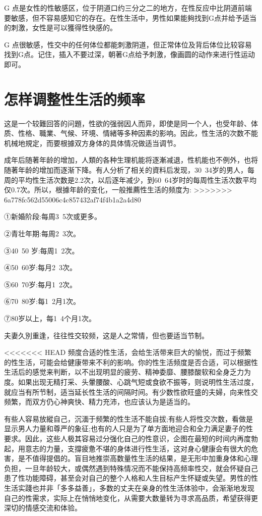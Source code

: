 \documentclass[12pt,UTF8]{ctexbook}
\begin{document}
G 点是女性的性敏感区，位于阴道口约三分之二的地方，在性反应中比阴道前端要敏感，但不容易感知它的存在。在性生活中，男性如果能夠找到G点并给予适当的刺激，女性是可以獲得性快感的。

G 点很敏感，性交中的任何体位都能刺激阴道，但正常体位及背后体位比较容易找到G点。记住，插入不要过深，朝著G点给予刺激，像画圆的动作来进行性运动即可。

\section{怎样调整性生活的频率}

这是一个较難回答的问題，性欲的强弱因人而异，即使是同一个人，也受年龄、体质、性格、職業、气候、环境、情緒等多种因素的影响。因此，性生活的次数不能机械地規定，而要根據双方身体的具体情况做适当调节。

成年后随著年龄的增加，人類的各种生理机能将逐漸减退，性机能也不例外，也将随著年龄的增加而逐渐下降。有人分析了相关的資料后发现，30~34岁的男人，每周的平均性生活次数是2.2次，以后逐年减少，到60~64岁时的每周性生活次数平均仅0.7次。所以，根據年龄的变化，一般推薦性生活的频度为:
>>>>>>> 6a778fc562d55006c4c857432af74f4b1a2a4d80

①新婚阶段:每周3~5次或更多。

②青壮年期:每周2~3次。

③40~50 岁:每周1~2次。

④50~60岁:每月2~3次。

⑤60~70岁:每月1~2次。

⑥70~80岁:每1~2月1次。

⑦80岁以上，每1~4个月1次。

夫妻久別重逢，往往性交较频，这是人之常情，但也要适当节制。

<<<<<<< HEAD
频度合适的性生活，会给生活带来巨大的愉悦，而过于频繁的性生活，可能会给健康带来不利的影响。你的性生活频度是否合适，可以根据性生活后的感觉来判断，以不出现明显的疲劳、精神委靡、腰膝酸软和全身乏力为度。如果出现无精打采、头暈腰酸、心跳气短或食欲不振等，则说明性生活过度，就应当有所节制，适当延长性生活的间隔时间。有少数性欲旺盛的夫婦，向来性交频繁，而双方仍心神爽快、精力充沛，也应该认为是适当的。

有些人容易放縱自己，沉湎于频繁的性生活不能自拔;有些人将性交次数，看做是显示男人力量和尊严的象征;也有的人只是为了单方面地迎合和全力满足妻子的性要求。因此，这些人极其容易过分强化自己的性意识，企图在最短的时间内再度勃起，用意志的力量，支撐疲惫不堪的身体进行性生活，这对身心健康会有很大的危害，是不值得提倡的。盲目地推崇高数量性生活的结果，是无形中加重身体和心理负担，一旦年龄较大，或偶然遇到特殊情况而不能保持高频率性交，就会怀疑自己患了性功能障碍，甚至会对自己的整个人格和人生目标产生怀疑或失望。男性的性生活实踐也并非「多多益善」，多数的丈夫在亲身的性生活体验中，会渐渐地发现自己的性需求，实际上在悄悄地变化，从需要大数量转为寻求高品质，希望获得更深切的情感交流和体验。
\end{document}
